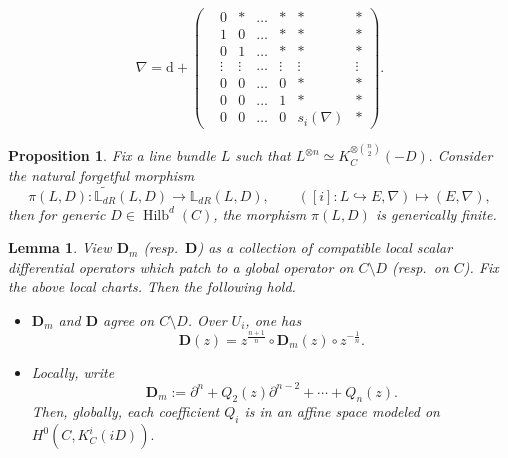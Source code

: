 \documentclass[10pt,a4paper]{amsart}
\newtheorem{proposition}{Proposition}
\newtheorem{lemma}{Lemma}
\begin{document}
\begin{equation}\label{eqn-nabla-filtration}
    \nabla = \mathrm{d} +
    \begin{pmatrix}
        &0  &\ast &\dots &\ast &\ast &\ast  \\
        &1 &0 &\dots &\ast &\ast &\ast \\
        &0 &1 &\dots &\ast &\ast &\ast \\
        &\vdots  &\vdots &\dots &\vdots  &\vdots &\vdots \\
        &0  &0 &\dots &0 &\ast &\ast \\
        &0  &0 &\dots &1 &\ast &\ast \\
        &0  &0 &\dots &0 &s_i(\nabla) &\ast 
    \end{pmatrix}.
\end{equation}

\begin{proposition}\label{p: generic finite dR}
Fix a line bundle \(L\) such that
\(
L^{\otimes n}\simeq K_C^{\otimes \binom{n}{2}}(-D).
\)
Consider the natural forgetful morphism
\[
\pi(L,D)\colon
\widetilde{\mathbb{L}_{dR}}(L,D)
\longrightarrow
\mathbb{L}_{dR}(L,D),
\qquad
([i]\colon L\hookrightarrow E,\nabla)\longmapsto (E,\nabla),
\]
then for generic \(D\in \operatorname{Hilb}^d(C)\), the morphism \(\pi(L,D)\) is generically finite.
\end{proposition}

\begin{lemma}\label{p:trans of diff opers}
View $\mathbf D_m$ (resp.\ $\mathbf D$) as a collection of compatible local scalar differential operators which patch to a global operator on $C\setminus D$ (resp.\ on $C$). Fix the above local charts. Then the following hold.
\begin{itemize}
    \item 
$\mathbf D_m$ and $\mathbf D$ agree on $C\setminus D$.
Over $U_i$, one has
\begin{equation}\label{e:transform rule of mero oper0}
\mathbf D(z)
=
z^{\frac{n+1}{n}}\circ \mathbf D_m(z) \circ z^{-\frac{1}{n}} .
\end{equation}

\item Locally, write
\begin{equation}\label{local Dm}
\mathbf D_m
:= \partial^n + Q_2(z)\partial^{n-2} + \cdots + Q_n(z).
\end{equation}
Then, globally, each coefficient $Q_i$ is in an affine space modeled on
\(
H^0\!\left(C,K_C^i(iD)\right).
\)
\end{itemize}
\end{lemma}
\end{document}
